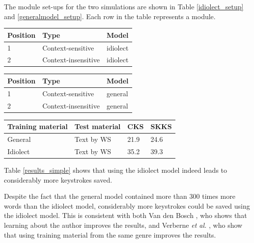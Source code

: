 \documentclass[11pt]{article}
\let\originaltable\table
\let\endoriginaltable\endtable
\renewenvironment{table}[1][ht]{%
  \originaltable[#1]
  \centering}%
  {\endoriginaltable}
\begin{document}
The module set-ups for the two simulations are shown in Table \ref{idiolect_setup} and \ref{generalmodel_setup}. Each row in the table represents a module.

\begin{table}[H]
\begin{tabular}{lll} 
Position&Type&Model\\
\hline
1&Context-sensitive&idiolect\\
2&Context-insensitive&idiolect\\
\end{tabular} 
\caption{Module order for a simple idiolect simulation.} \label{idiolect_setup}  
\end{table}

\begin{table}[H]
\begin{tabular}{lll} 
Position&Type&Model\\
\hline
1&Context-sensitive&general\\
2&Context-insensitive&general\\
\end{tabular} 
\caption{Module order for a simulation for the general model.} \label{generalmodel_setup} 
\end{table}


\begin{table}[H]
\begin{tabular}{ll|ll} 
Training material&Test material&CKS&SKKS\\
\hline
General &Text by WS&21.9&24.6\\
Idiolect&Text by WS&35.2&39.3\\
\end{tabular} 
\caption{Percentage of keystrokes that can be saved when using the general and the idiolect model} \label{results_simple}
\end{table}

Table \ref{results_simple} shows that  using the idiolect model indeed leads to considerably more keystrokes saved. 

Despite the fact that the general model contained more than 300 times more words than the idiolect model, considerably more keystrokes could be saved using the idiolect model. This is consistent with both Van den Bosch , who shows that learning about the author improves the results, and Verberne {\em et al.} , who show that using training material from the same genre improves the results.
\end{document}
